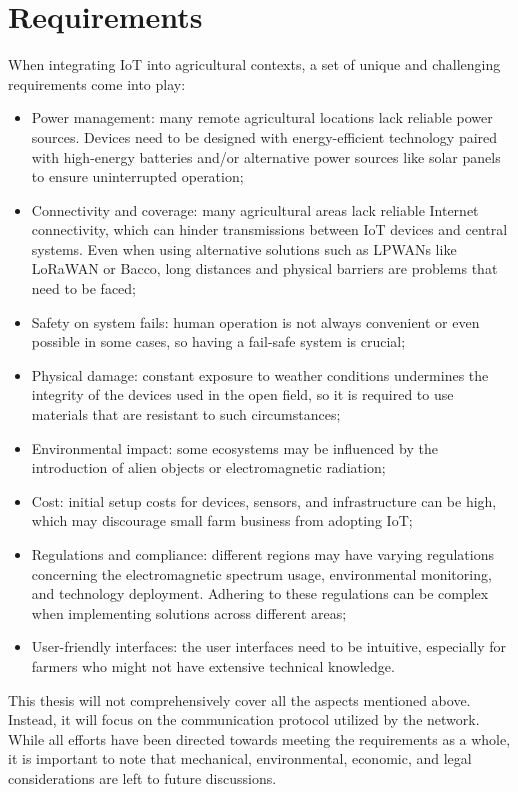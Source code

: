 \section{Requirements}
When integrating \gls{IoT} into agricultural contexts, a set of unique and challenging requirements come into play:
\begin{itemize}
    \item Power management: many remote agricultural locations lack reliable power sources. Devices need to be
        designed with energy-efficient technology paired with high-energy batteries and/or alternative power sources
        like solar panels to ensure uninterrupted operation;
    \item Connectivity and coverage: many agricultural areas lack reliable Internet connectivity, which can hinder
        transmissions between IoT devices and central systems. Even when using alternative solutions such as
        \glspl{LPWAN} like LoRaWAN or Bacco, long distances and physical barriers are problems that need to be faced;
    \item Safety on system fails: human operation is not always convenient or even possible in
        some cases, so having a fail-safe system is crucial;
    \item Physical damage: constant exposure to weather conditions undermines the integrity of the devices used in the
        open field, so it is required to use materials that are resistant to such circumstances;
    \item Environmental impact: some ecosystems may be influenced by the introduction of alien objects or
        electromagnetic radiation;
    \item Cost: initial setup costs for devices, sensors, and infrastructure can be high, which may discourage small
        farm business from adopting \gls{IoT};
    \item Regulations and compliance: different regions may have varying regulations concerning the electromagnetic
        spectrum usage, environmental monitoring, and technology deployment. Adhering to these regulations can be
        complex when implementing solutions across different areas;
    \item User-friendly interfaces: the user interfaces need to be intuitive, especially for farmers who might not
        have extensive technical knowledge.
\end{itemize}
This thesis will not comprehensively cover all the aspects mentioned above. Instead, it will focus on the
communication protocol utilized by the network. While all efforts have been directed towards meeting the
requirements as a whole, it is important to note that mechanical, environmental, economic, and legal considerations are
left to future discussions.

